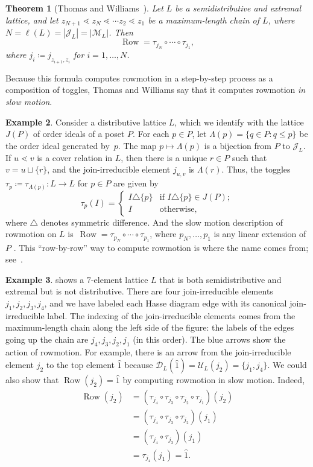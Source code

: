 \documentclass[11pt]{amsart}
\DeclareMathOperator{\row}{Row}
\newtheorem{theorem}{Theorem}[section]
\theoremstyle{definition}
\newtheorem{example}[theorem]{Example}
\begin{document}
\begin{theorem}[{Thomas and Williams~\cite{thomas2019rowmotion}}]
Let $L$ be a semidistributive and extremal lattice, and let $z_{N+1}\lessdot z_{N}\lessdot \cdots z_2 \lessdot z_1$ be a maximum-length chain of $L$, where $N=\ell(L)=|\mathcal J_L|=|\mathcal M_L|$. Then
\[\row=\tau_{j_N}\circ\cdots\circ\tau_{j_1},\]
where $j_i \coloneqq j_{z_{i+1},z_{i}}$ for $i=1,\ldots,N$.
\end{theorem}

Because this formula computes rowmotion in a step-by-step process as a composition of toggles, Thomas and Williams say that it computes rowmotion \emph{in slow motion}.

\begin{example}
Consider a distributive lattice $L$, which we identify with the lattice $J(P)$ of order ideals of a poset $P$. For each $p\in P$, let $\Lambda(p)=\{q\in P:q\leq p\}$ be the order ideal generated by~$p$. The map $p\mapsto \Lambda(p)$ is a bijection from $P$ to $\mathcal J_L$. If $u\lessdot v$ is a cover relation in $L$, then there is a unique $r\in P$ such that $v=u\sqcup\{r\}$, and the join-irreducible element $j_{u,v}$ is $\Lambda(r)$. Thus, the toggles~$\tau_p \coloneqq \tau_{\Lambda(p)}\colon L \to L$ for $p \in P$ are given by 
\[\tau_{p}(I)=\begin{cases}
    I\triangle\{p\} & \text{if } I\triangle \{p\} \in J(P); \\
    I & \text{otherwise}, 
\end{cases}\]
where $\triangle$ denotes symmetric difference. And the slow motion description of rowmotion on $L$ is~$\row = \tau_{p_N} \circ \cdots \circ \tau_{p_1}$, where $p_N, \ldots, p_1$ is any linear extension of $P$ \cite{cameron1995orbits}. This ``row-by-row'' way to compute rowmotion is where the name comes from; see~\cite{striker2012rowmotion}.
\end{example}

\begin{example}
 shows a $7$-element lattice $L$ that is both semidistributive and extremal but is not distributive. There are four join-irreducible elements $j_1,j_2,j_3,j_4$, and we have labeled each Hasse diagram edge with its canonical join-irreducible label. The indexing of the join-irreducible elements comes from the maximum-length chain along the left side of the figure: the labels of the edges going up the chain are $j_4,j_3,j_2,j_1$ (in this order). The blue arrows show the action of rowmotion. For example, there is an arrow from the join-irreducible element $j_2$ to the top element $\hat 1$ because $\mathcal D_L(\hat 1)=\mathcal U_L(j_2)=\{j_1,j_4\}$. We could also show that $\row(j_2)=\hat 1$ by computing rowmotion in slow motion. Indeed,
\begin{align*}
\row(j_2)&=(\tau_{j_4}\circ\tau_{j_3}\circ\tau_{j_2}\circ\tau_{j_1})(j_2) \\
 &=(\tau_{j_4}\circ\tau_{j_3}\circ\tau_{j_2})(j_1) \\ 
 &=(\tau_{j_4}\circ\tau_{j_3})(j_1) \\ 
 &=\tau_{j_4}(j_1) =\hat 1. 
\end{align*}
\end{example} 
\end{document}

